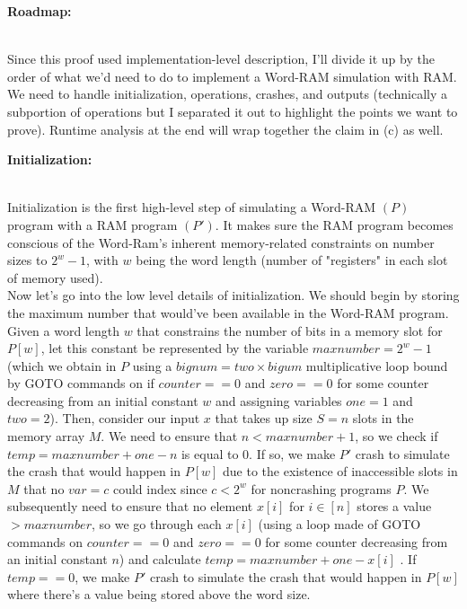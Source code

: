 \documentclass[11pt]{article}
\begin{document}
\begin{enumerate}
\begin{center}
\textbf{    Roadmap:}
\end{center} \\

Since this proof used implementation-level description, I'll divide it up by the order of what we'd need to do to implement a Word-RAM simulation with RAM. We need to handle initialization, operations, crashes, and outputs (technically a subportion of operations but I separated it out to highlight the points we want to prove). Runtime analysis at the end will wrap together the claim in (c) as well. \\

\begin{center}
\textbf{    Initialization:}
\end{center} \\

Initialization is the first high-level step of simulating a Word-RAM $(P)$ program with a RAM program $(P')$. It makes sure the RAM program becomes conscious of the Word-Ram's inherent memory-related constraints on number sizes to $2^w -  1$, with $w$ being the word length (number of "registers" in each slot of memory used). \\

Now let's go into the low level details of initialization. We should begin by storing the maximum number that would've been available in the Word-RAM program. Given a word length $w$ that constrains the number of bits in a memory slot for $P[w]$, let this constant be represented by the variable $maxnumber = 2^w - 1$ (which we obtain in $P$ using a $bignum = two \times bigum$ multiplicative loop bound by GOTO commands on if $counter == 0$ and $zero == 0$ for some counter decreasing from an initial constant $w$ and assigning variables $one = 1$ and $two = 2$). Then, consider our input $x$ that takes up size $S = n$ slots in the memory array $M$. We need to ensure that $n < maxnumber + 1$, so we check if $temp = maxnumber + one - n$ is equal to 0. If so, we make $P'$ crash to simulate the crash that would happen in $P[w]$ due to the existence of inaccessible slots in $M$ that no $var = c$ could index since $c < 2^w$ for noncrashing programs $P$. We subsequently need to ensure that no element $x[i]$ for $i \in [n]$ stores a value $> maxnumber$, so we go through each $x[i]$ (using a loop made of GOTO commands on $counter == 0$ and $zero == 0$ for some counter decreasing from an initial constant $n$) and calculate $temp = maxnumber + one - x[i]$ . If $temp == 0$, we make $P'$ crash to simulate the crash that would happen in $P[w]$ where there's a value being stored above the word size. \\


\end{enumerate}
\end{document}

